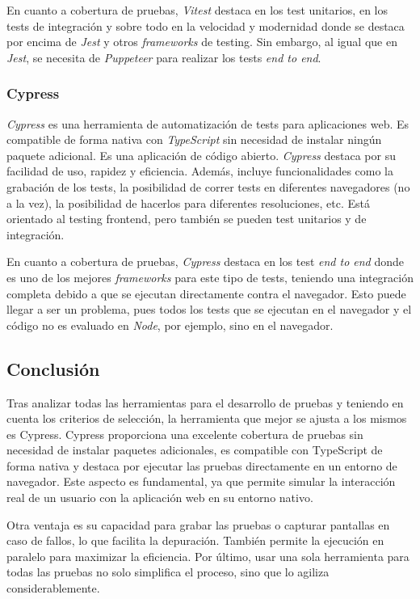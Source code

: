 En cuanto a cobertura de pruebas, \textit{Vitest} destaca en los test unitarios, en los tests de integración y sobre todo en la velocidad y modernidad donde se destaca por encima de \textit{Jest} y otros \textit{frameworks} de testing. Sin embargo, al igual que en \textit{Jest}, se necesita de \textit{Puppeteer} para realizar los tests \textit{end to end}.

\subsubsection{Cypress}

\textit{Cypress} es una herramienta de automatización de tests para aplicaciones web. Es compatible de forma nativa con \textit{TypeScript} sin necesidad de instalar ningún paquete adicional. Es una aplicación de código abierto. \textit{Cypress} destaca por su facilidad de uso, rapidez y eficiencia. Además, incluye funcionalidades como la grabación de los tests, la posibilidad de correr tests en diferentes navegadores (no a la vez), la posibilidad de hacerlos para diferentes resoluciones, etc. Está orientado al testing frontend, pero también se pueden test unitarios y de integración.

En cuanto a cobertura de pruebas, \textit{Cypress} destaca en los test \textit{end to end} donde es uno de los mejores \textit{frameworks} para este tipo de tests, teniendo una integración completa debido a que se ejecutan directamente contra el navegador. Esto puede llegar a ser un problema, pues todos los tests que se ejecutan en el navegador y el código no es evaluado en \textit{Node}, por ejemplo, sino en el navegador.

\subsection{Conclusión}

Tras analizar todas las herramientas para el desarrollo de pruebas y teniendo en cuenta los criterios de selección, la herramienta que mejor se ajusta a los mismos es Cypress. Cypress proporciona una excelente cobertura de pruebas sin necesidad de instalar paquetes adicionales, es compatible con TypeScript de forma nativa y destaca por ejecutar las pruebas directamente en un entorno de navegador. Este aspecto es fundamental, ya que permite simular la interacción real de un usuario con la aplicación web en su entorno nativo.

Otra ventaja es su capacidad para grabar las pruebas o capturar pantallas en caso de fallos, lo que facilita la depuración. También permite la ejecución en paralelo para maximizar la eficiencia. Por último, usar una sola herramienta para todas las pruebas no solo simplifica el proceso, sino que lo agiliza considerablemente.

